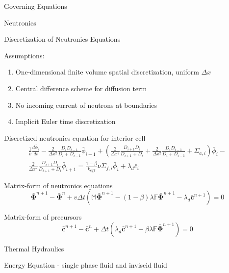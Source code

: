 \documentclass{beamer}
\begin{document}
\begin{section}{Governing Equations}
\begin{frame}{Neutronics}
\begin{customlist}{2ex}{0pt}
\end{customlist}
\end{frame}
\begin{frame}{Discretization of Neutronics Equations}
\begin{block}{Assumptions:}
\begin{enumerate}
  \item One-dimensional finite volume spatial discretization, uniform $\Delta x$
  \item Central difference scheme for diffusion term
  \item No incoming current of neutrons at boundaries
  \item Implicit Euler time discretization
\end{enumerate}
\end{block}
\begin{customlist}{2ex}{0pt}
  \item Discretized neutronics equation for interior cell
  \begin{multline}
    \nonumber
    \frac{1}{v}\frac{d\bar{\phi}_{i}}{dt}-\frac{2}{\Delta x^{2}}\frac{D_{i}D_{i-1}}{D_{i}+D_{i-1}}\bar{\phi}_{i-1}+\left(\frac{2}{\Delta x^{2}}\frac{D_{i+1}D_{i}}{D_{i+1}+D_{i}}+\frac{2}{\Delta x^{2}}\frac{D_{i}D_{i-1}}{D_{i}+D_{i-1}}+\Sigma_{a,i}\right)\bar{\phi}_{i}-\\
    \frac{2}{\Delta x^{2}}\frac{D_{i+1}D_{i}}{D_{i+1}+D_{i}}\bar{\phi}_{i+1}=\frac{1-\beta}{k_{eff}}\nu\Sigma_{f,i}\bar{\phi}_{i}+\lambda_{d}\bar{c}_{i}
  \end{multline}
  \item Matrix-form of neutronics equations
  \[
    \bar{\mathbf{\Phi}}^{n+1}-\bar{\mathbf{\Phi}}^{n}+v\Delta t\left(\mathbb{M}\bar{\mathbf{\Phi}}^{n+1}-\left(1-\beta\right)\lambda\mathbb{F}\bar{\mathbf{\Phi}}^{n+1}-\lambda_{d}\mathbf{\bar{c}}^{n+1}\right)=0
  \]
  \item Matrix-form of precursors
  \[
    \mathbf{\bar{c}}^{n+1}-\mathbf{\bar{c}}^{n}+\Delta t\left(\lambda_{d}\mathbf{\bar{c}}^{n+1}-\beta\lambda\mathbb{F}\bar{\mathbf{\Phi}}^{n+1}\right)=0
  \]
\end{customlist}
\end{frame}
\begin{frame}{Thermal Hydraulics}
\begin{customlist}{2ex}{0pt}
  \item Energy Equation - single phase fluid and inviscid fluid

\end{customlist}
\end{frame}
\end{section}
\end{document}
